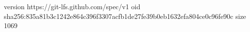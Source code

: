 version https://git-lfs.github.com/spec/v1
oid sha256:835a81b3c1242e864c396f3307acfb1de27fe39b0eb1632efa804ce0c96fe90c
size 1069
